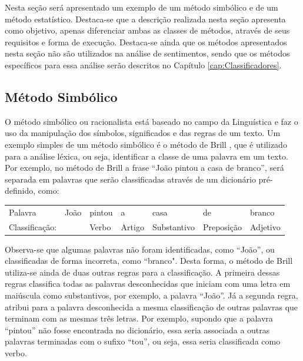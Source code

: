 Nesta seção será apresentado um exemplo de um método simbólico e de um método
estatístico.
Destaca-se que a descrição realizada nesta seção apresenta como objetivo, apenas
diferenciar ambas as classes de métodos, através de seus requisitos e forma de execução.
Destaca-se ainda que os métodos apresentados nesta seção não são utilizados na
análise de sentimentos, sendo que os métodos específicos para essa
análise serão descritos no Capítulo \ref{cap:Classificadores}.


\subsection{Método Simbólico}
O método simbólico ou racionalista está
baseado no campo da Linguística e faz o uso da manipulação dos símbolos,
significados e das regras de um texto. Um exemplo simples de um método simbólico
é o método de Brill \cite{Brill:1992:SRP:974499.974526}, que é utilizado para a
análise léxica, ou seja, identificar a classe de uma palavra em um texto.
Por exemplo, no método de Brill a frase ``João pintou a casa de branco'', será separada em palavras que
serão classificadas através de um dicionário pré-definido, como:

\begin{table}[htb]
\centering
\begin{tabular}{l|l|l|l|l|l|l}
Palavra         & João        & pintou & a      & casa        & de
& branco
\\
Classificação:   & 			   & Verbo  & Artigo & Substantivo & Preposição & Adjetivo
\end{tabular}
\label{my-label}
\end{table}

Observa-se que algumas palavras não foram
identificadas, como ``João'', ou classificadas de forma incorreta, como
``branco". Desta forma, o método de Brill utiliza-se ainda de duas outras
regras para a classificação.
A primeira dessas regras classifica todas as palavras desconhecidas que
iniciam com uma letra em maiúscula como substantivos, por exemplo, a palavra ``João''. Já a
segunda regra, atribui para a palavra desconhecida a mesma classificação de outras palavras que terminam com as mesmas três letras. Por exemplo, supondo
que a palavra ``pintou'' não fosse encontrada no dicionário, essa seria
associada a outras palavras terminadas com o sufixo ``tou'', ou seja, essa seria
classificada como verbo.

